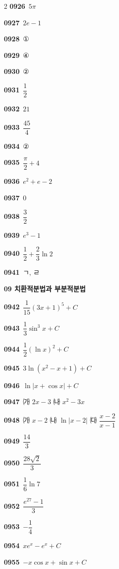 \documentclass[10pt,a4paper]{article}
\begin{document}
\begin{multicols}{2}
\noindent\textbf{0926}\ $5\pi$\par
\noindent\textbf{0927}\ $2e-1$\par
\noindent\textbf{0928}\ ①\par
\noindent\textbf{0929}\ ④\par
\noindent\textbf{0930}\ ②\par
\noindent\textbf{0931}\ $\dfrac{1}{2}$\par
\noindent\textbf{0932}\ $21$\par
\noindent\textbf{0933}\ $\dfrac{45}{4}$\par
\noindent\textbf{0934}\ ②\par
\noindent\textbf{0935}\ $\dfrac{\pi}{2}+4$\par
\noindent\textbf{0936}\ $e^2+e-2$\par
\noindent\textbf{0937}\ $0$\par
\noindent\textbf{0938}\ $\dfrac{3}{2}$\par
\noindent\textbf{0939}\ $e^3-1$\par
\noindent\textbf{0940}\ $\dfrac{1}{2}+\dfrac{2}{3}\ln 2$\par
\noindent\textbf{0941}\ ㄱ, ㄹ\par
\noindent\textbf{09 치환적분법과 부분적분법}\par\smallskip
\noindent\textbf{0942}\ $\dfrac{1}{15}(3x+1)^5+C$\par
\noindent\textbf{0943}\ $\dfrac{1}{3}\sin^3 x+C$\par
\noindent\textbf{0944}\ $\dfrac{1}{2}(\ln x)^2+C$\par
\noindent\textbf{0945}\ $3\ln(x^2-x+1)+C$\par
\noindent\textbf{0946}\ $\ln|x+\cos x|+C$\par
\noindent\textbf{0947}\ ㈎ $2x-3$ ㈏ $x^2-3x$\par
\noindent\textbf{0948}\ ㈎ $x-2$ ㈏ $\ln|x-2|$ ㈐ $\dfrac{x-2}{x-1}$\par
\noindent\textbf{0949}\ $\dfrac{14}{3}$\par
\noindent\textbf{0950}\ $\dfrac{28\sqrt{2}}{3}$\par
\noindent\textbf{0951}\ $\dfrac{1}{6}\ln 7$\par
\noindent\textbf{0952}\ $\dfrac{e^{27}-1}{3}$\par
\noindent\textbf{0953}\ $-\dfrac{1}{4}$\par
\noindent\textbf{0954}\ $xe^x-e^x+C$\par
\noindent\textbf{0955}\ $-x\cos x+\sin x+C$\par

\end{multicols}
\end{document}
